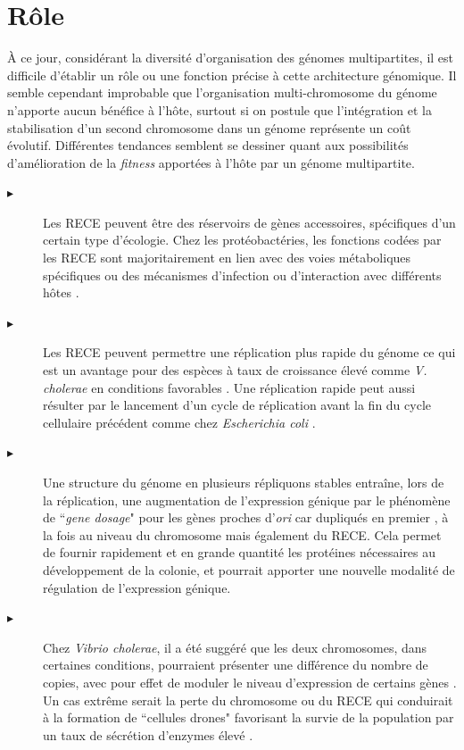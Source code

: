 	
 \section{Rôle}\label{chrIIfunc}
	À ce jour, considérant la diversité d'organisation des génomes multipartites, il est difficile d'établir un rôle ou une fonction précise à cette architecture génomique. Il semble cependant improbable que l'organisation multi-chromosome du génome n'apporte aucun bénéfice à l'hôte, surtout si on postule que l'intégration et la stabilisation d'un second chromosome dans un génome représente un coût évolutif. Différentes tendances semblent se dessiner quant aux possibilités d'amélioration de la \textit{fitness} apportées à l'hôte par un génome multipartite. 
\begin{description}
	\item[$\blacktriangleright$]  Les RECE peuvent être des réservoirs de gènes accessoires, spécifiques d'un certain type d'écologie. Chez les  protéobactéries, les fonctions codées par les RECE sont majoritairement en lien avec des voies métaboliques spécifiques ou des mécanismes d'infection ou d'interaction avec différents hôtes \citep{galardini2013replicon}.
	\item[$\blacktriangleright$] Les RECE peuvent permettre une réplication plus rapide du génome ce qui est un avantage pour des espèces à taux de croissance élevé comme \textit{V. cholerae} en conditions favorables \citep{yamaichi1999physical}. Une réplication rapide peut aussi résulter par le lancement d'un cycle de réplication avant la fin du cycle cellulaire précédent \citep{stokke2011replication} comme chez \textit{Escherichia coli} \citep{skarstad1986timing}.
	\item[$\blacktriangleright$] Une structure du génome en plusieurs répliquons stables entraîne, lors de la réplication, une augmentation de l'expression génique par le phénomène de ``\textit{gene dosage}" pour les gènes proches d'\textit{ori} car dupliqués en premier  \citep{Jha2012}, à la fois au niveau du chromosome mais également du RECE. Cela permet de fournir rapidement et en grande quantité les protéines nécessaires au développement de la colonie, et pourrait apporter une nouvelle modalité de régulation de l'expression génique. 
	\item[$\blacktriangleright$] Chez \textit{Vibrio cholerae}, il a été suggéré que les deux chromosomes, dans certaines conditions, pourraient présenter une différence du nombre de copies, avec pour effet de moduler le niveau d'expression de certains gènes \citep{Heidelberg2000}. Un cas extrême serait la perte du chromosome ou du RECE qui conduirait à la formation de ``cellules drones" favorisant la survie de la population par un taux de sécrétion d'enzymes élevé \citep{Jha2012}.

\end{description}
